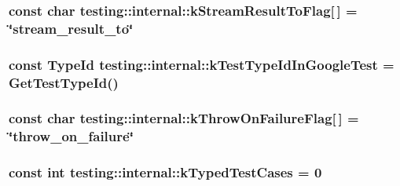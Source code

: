 \subsubsection[{k\+Stream\+Result\+To\+Flag}]{\setlength{\rightskip}{0pt plus 5cm}const char testing\+::internal\+::k\+Stream\+Result\+To\+Flag\mbox{[}$\,$\mbox{]} = \char`\"{}stream\+\_\+result\+\_\+to\char`\"{}}\label{namespacetesting_1_1internal_a84f8a2102d45c8b2b35be06d14ffefb8}
\hypertarget{namespacetesting_1_1internal_acac7993efabbd9dd62c1e9c7d143a72f}{}
\subsubsection[{k\+Test\+Type\+Id\+In\+Google\+Test}]{\setlength{\rightskip}{0pt plus 5cm}const {\bf Type\+Id} testing\+::internal\+::k\+Test\+Type\+Id\+In\+Google\+Test = {\bf Get\+Test\+Type\+Id}()}\label{namespacetesting_1_1internal_acac7993efabbd9dd62c1e9c7d143a72f}
\hypertarget{namespacetesting_1_1internal_ad9efcf363de3483afd91c7393a4fefb8}{}
\subsubsection[{k\+Throw\+On\+Failure\+Flag}]{\setlength{\rightskip}{0pt plus 5cm}const char testing\+::internal\+::k\+Throw\+On\+Failure\+Flag\mbox{[}$\,$\mbox{]} = \char`\"{}throw\+\_\+on\+\_\+failure\char`\"{}}\label{namespacetesting_1_1internal_ad9efcf363de3483afd91c7393a4fefb8}
\hypertarget{namespacetesting_1_1internal_a685ea5332074ae63b0ded2b184ac2271}{}
\subsubsection[{k\+Typed\+Test\+Cases}]{\setlength{\rightskip}{0pt plus 5cm}const int testing\+::internal\+::k\+Typed\+Test\+Cases = 0}\label{namespacetesting_1_1internal_a685ea5332074ae63b0ded2b184ac2271}
\hypertarget{namespacetesting_1_1internal_a53ee2d113744f9ba1d89469db4d7388b}{}
